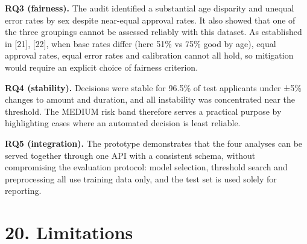 \documentclass[
  11pt,
]{article}
\begin{document}
\textbf{RQ3 (fairness).} The audit identified a substantial age
disparity and unequal error rates by sex despite near-equal approval
rates. It also showed that one of the three groupings cannot be assessed
reliably with this dataset. As established in {[}21{]}, {[}22{]}, when
base rates differ (here 51\% vs 75\% good by age), equal approval rates,
equal error rates and calibration cannot all hold, so mitigation would
require an explicit choice of fairness criterion.

\textbf{RQ4 (stability).} Decisions were stable for 96.5\% of test
applicants under ±5\% changes to amount and duration, and all
instability was concentrated near the threshold. The MEDIUM risk band
therefore serves a practical purpose by highlighting cases where an
automated decision is least reliable.

\textbf{RQ5 (integration).} The prototype demonstrates that the four
analyses can be served together through one API with a consistent
schema, without compromising the evaluation protocol: model selection,
threshold search and preprocessing all use training data only, and the
test set is used solely for reporting.

\hypertarget{limitations}{%
\section{20. Limitations}\label{limitations}}
\end{document}

